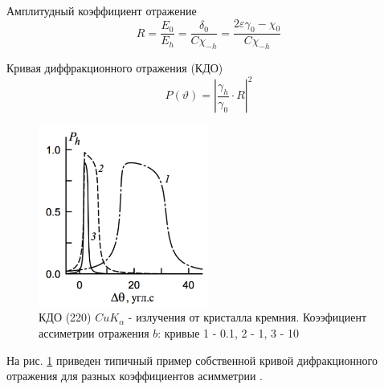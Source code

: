 Амплитудный коэффициент отражение
\begin{equation}
    R = \frac{E_0}{E_h} = \frac{\delta_0}{C\chi_{-h}} = \frac{2\varepsilon\gamma_0-\chi_0}{C\chi_{-h}}
\end{equation}

Кривая диффракционного отражения (КДО) \cite{Bushuev_Oreshko_2002}
\begin{equation}
    \label{eq:KDO_self}
    P (\vartheta) =  |\frac{\gamma_h}{\gamma_0} \cdot R|^2
\end{equation}


\begin{figure}[H]
  \centering
  \includegraphics[width=0.5\textwidth]{images/typical_rocking_curve.png}
  \caption{КДО (220) $CuK_{\alpha}$ - излучения от кристалла кремния. Коээфициент ассиметрии
  отражения $b$: кривые 1 - 0.1, 2 - 1, 3 - 10}
  \label{ris:typical_rocking_curve}
\end{figure}

На рис. \ref{ris:typical_rocking_curve} приведен типичный пример собственной кривой дифракционного отражения
для разных коэффициентов асимметрии \cite{Bushuev_Oreshko_2002}.

